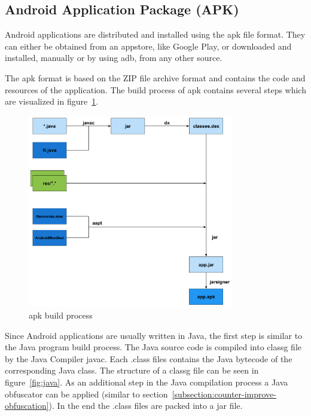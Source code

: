\subsection{Android Application Package (APK)} \label{subsection:foundation-android-package}
Android applications are distributed and installed using the \gls{apk} file format.
They can either be obtained from an appstore, like Google Play, or downloaded and installed, manually or by using \gls{adb}, from any other source.

The \gls{apk} format is based on the ZIP file archive format and contains the code and resources of the application.
The build process of \gls{apk} contains several steps which are visualized in figure~\ref{fig:apk}.
\newline
\begin{figure}[h]
    \centering
    \includegraphics[width=0.8\textwidth]{data/apk.png}
    \caption{\gls{apk} build process \cite{andevconDalvikART}}
    \label{fig:apk}
\end{figure}
Since Android applications are usually written in Java, the first step is similar to the Java program build process.
The Java source code is compiled into \gls{classg} file by the Java Compiler javac.
Each .class files contains the Java bytecode of the corresponding Java class.
The structure of a \gls{classg} file can be seen in figure~\ref{fig:java}.
As an additional step in the Java compilation process a Java obfuscator can be applied (similar to section~\ref{subsection:counter-improve-obfuscation}).
In the end the .class files are packed into a \gls{jar} file.
\newline
